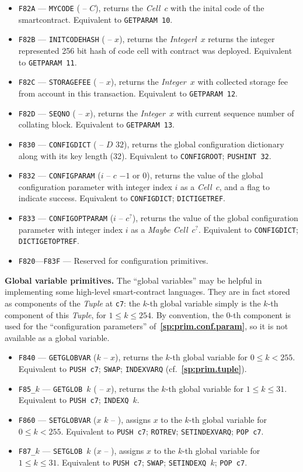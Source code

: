 \documentclass[12pt,oneside]{article}
\def\makepoint#1{\medbreak\noindent{\bf #1.\ }}
\def\nxsubpoint{\refstepcounter{subsubsection}%
  \smallbreak\makepoint{\thesubsubsection}}
\def\refpoint#1{{\rm\textbf{\ref{#1}}}}
\let\ptref=\refpoint
\def\emb#1{\textbf{#1.}}
\begin{document}
\begin{itemize}
\item {\tt F82A} --- {\tt MYCODE} ( -- $C$), returns the {\em Cell\/}~$c$ with the inital code of the smartcontract. Equivalent to {\tt GETPARAM 10}.
\item {\tt F82B} --- {\tt INITCODEHASH} ( -- $x$), returns the {\em Integerl\/}~$x$ returns the integer represented 256 bit hash of code cell with contract was deployed. Equivalent to {\tt GETPARAM 11}.
\item {\tt F82C} --- {\tt STORAGEFEE} ( -- $x$), returns the {\em Integer\/}~$x$ with collected storage fee from account in this transaction. Equivalent to {\tt GETPARAM 12}.
\item {\tt F82D} --- {\tt SEQNO} ( -- $x$), returns the {\em Integer\/}~$x$ with current sequence number of collating block. Equivalent to {\tt GETPARAM 13}.
\item {\tt F830} --- {\tt CONFIGDICT} ( -- $D$ $32$), returns the global configuration dictionary along with its key length (32). Equivalent to {\tt CONFIGROOT}; {\tt PUSHINT 32}.
\item {\tt F832} --- {\tt CONFIGPARAM} ($i$ -- $c$ $-1$ or $0$), returns the value of the global configuration parameter with integer index $i$ as a {\em Cell\/}~$c$, and a flag to indicate success. Equivalent to {\tt CONFIGDICT}; {\tt DICTIGETREF}.
\item {\tt F833} --- {\tt CONFIGOPTPARAM} ($i$ -- $c^?$), returns the value of the global configuration parameter with integer index $i$ as a {\em Maybe Cell\/}~$c^?$. Equivalent to {\tt CONFIGDICT}; {\tt DICTIGETOPTREF}.
\item {\tt F820}---{\tt F83F} --- Reserved for configuration primitives.
\end{itemize}

\nxsubpoint\emb{Global variable primitives}
The ``global variables'' may be helpful in implementing some high-level smart-contract languages. They are in fact stored as components of the {\em Tuple\/} at {\tt c7}: the $k$-th global variable simply is the $k$-th component of this {\em Tuple}, for $1\leq k\leq 254$. By convention, the $0$-th component is used for the ``configuration parameters'' of~\ptref{sp:prim.conf.param}, so it is not available as a global variable.
\begin{itemize}
\item {\tt F840} --- {\tt GETGLOBVAR} ($k$ -- $x$), returns the $k$-th global variable for $0\leq k<255$. Equivalent to {\tt PUSH c7}; {\tt SWAP}; {\tt INDEXVARQ} (cf.~\ptref{sp:prim.tuple}).
\item {\tt F85\_$k$} --- {\tt GETGLOB $k$} ( -- $x$), returns the $k$-th global variable for $1\leq k\leq 31$. Equivalent to {\tt PUSH c7}; {\tt INDEXQ $k$}.
\item {\tt F860} --- {\tt SETGLOBVAR} ($x$ $k$ -- ), assigns $x$ to the $k$-th global variable for $0\leq k<255$. Equivalent to {\tt PUSH c7}; {\tt ROTREV}; {\tt SETINDEXVARQ}; {\tt POP c7}.
\item {\tt F87\_$k$} --- {\tt SETGLOB $k$} ($x$ -- ), assigns $x$ to the $k$-th global variable for $1\leq k\leq 31$. Equivalent to {\tt PUSH c7}; {\tt SWAP}; {\tt SETINDEXQ $k$}; {\tt POP c7}.
\end{itemize}
\end{document}

